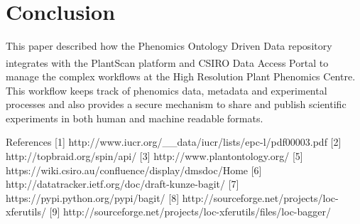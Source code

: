 \documentclass{llncs}
\begin{document}
\section{Conclusion}
This paper described how the Phenomics Ontology Driven Data repository
integrates with the PlantScan\textsuperscript{\texttrademark} platform and CSIRO
Data Access Portal to manage
the complex workflows at the High Resolution Plant Phenomics Centre. This
workflow keeps track of phenomics data, metadata and experimental processes and
also provides a secure mechanism to share and publish scientific experiments in
both human and machine readable formats.




References
[1] http://www.iucr.org/\_\_data/iucr/lists/epc-l/pdf00003.pdf
[2] http://topbraid.org/spin/api/
[3] http://www.plantontology.org/
[5] https://wiki.csiro.au/confluence/display/dmsdoc/Home
[6] http://datatracker.ietf.org/doc/draft-kunze-bagit/
[7] https://pypi.python.org/pypi/bagit/
[8] http://sourceforge.net/projects/loc-xferutils/
[9] http://sourceforge.net/projects/loc-xferutils/files/loc-bagger/
\end{document}
